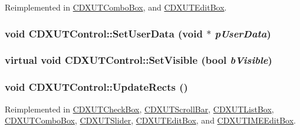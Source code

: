 Reimplemented in \hyperlink{class_c_d_x_u_t_combo_box_ab023a8c2522432d14096f70fb902a0d4}{CDXUTComboBox}, and \hyperlink{class_c_d_x_u_t_edit_box_a7240aa451e6662077671f754f331edfa}{CDXUTEditBox}.\hypertarget{class_c_d_x_u_t_control_a1545674f9f77e192fb5b7151a29d5862}{
\subsubsection[{SetUserData}]{\setlength{\rightskip}{0pt plus 5cm}void CDXUTControl::SetUserData (void $\ast$ {\em pUserData})}}
\label{class_c_d_x_u_t_control_a1545674f9f77e192fb5b7151a29d5862}
\hypertarget{class_c_d_x_u_t_control_a13061e9ab7d8d4398de7bde72d46a65d}{
\subsubsection[{SetVisible}]{\setlength{\rightskip}{0pt plus 5cm}virtual void CDXUTControl::SetVisible (bool {\em bVisible})}}
\label{class_c_d_x_u_t_control_a13061e9ab7d8d4398de7bde72d46a65d}
\hypertarget{class_c_d_x_u_t_control_a5fb3a79178c678abaa0da57566a09002}{
\subsubsection[{UpdateRects}]{\setlength{\rightskip}{0pt plus 5cm}void CDXUTControl::UpdateRects ()}}
\label{class_c_d_x_u_t_control_a5fb3a79178c678abaa0da57566a09002}


Reimplemented in \hyperlink{class_c_d_x_u_t_check_box_a3b60479864ee9a21c14f92ff5373fc14}{CDXUTCheckBox}, \hyperlink{class_c_d_x_u_t_scroll_bar_ae25e1547d974b0913688da998e43d331}{CDXUTScrollBar}, \hyperlink{class_c_d_x_u_t_list_box_a295c60c194d1126086d26bad65a17efc}{CDXUTListBox}, \hyperlink{class_c_d_x_u_t_combo_box_a2170bab00045ce0e43f2381d2c5f3648}{CDXUTComboBox}, \hyperlink{class_c_d_x_u_t_slider_a091410aa578fc041b84e4173a969df58}{CDXUTSlider}, \hyperlink{class_c_d_x_u_t_edit_box_a86b6a5f6a509b4bc15f2edd8926718d5}{CDXUTEditBox}, and \hyperlink{class_c_d_x_u_t_i_m_e_edit_box_a5b000e31365cfc36ea9c01cce29d1656}{CDXUTIMEEditBox}.

